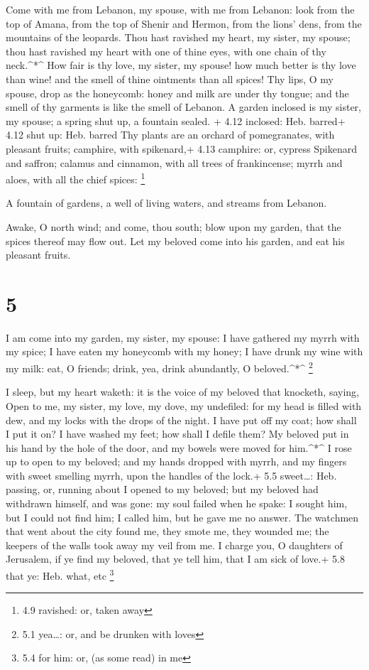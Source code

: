  Come with me from Lebanon, my spouse, with me from Lebanon:
look from the top of Amana, from the top of Shenir and Hermon, from the
lions' dens, from the mountains of the leopards.  Thou hast
ravished my heart, my sister, my spouse; thou hast ravished my heart
with one of thine eyes, with one chain of thy neck.\^{}*\^{}
 How fair is thy love, my sister, my spouse! how much
better is thy love than wine! and the smell of thine ointments than all
spices!  Thy lips, O my spouse, drop as the honeycomb:
honey and milk are under thy tongue; and the smell of thy garments is
like the smell of Lebanon.  A garden inclosed is my sister,
my spouse; a spring shut up, a fountain sealed. + 4.12 inclosed: Heb.
barred+ 4.12 shut up: Heb. barred  Thy plants are an
orchard of pomegranates, with pleasant fruits; camphire, with
spikenard,+ 4.13 camphire: or, cypress  Spikenard and
saffron; calamus and cinnamon, with all trees of frankincense; myrrh and
aloes, with all the chief spices: \footnote{4.9 ravished: or, taken away}

 A fountain of gardens, a well of living waters, and
streams from Lebanon.

 Awake, O north wind; and come, thou south; blow upon my
garden, that the spices thereof may flow out. Let my beloved come into
his garden, and eat his pleasant fruits.

\hypertarget{section-4}{%
\section{5}\label{section-4}}

 I am come into my garden, my sister, my spouse: I have
gathered my myrrh with my spice; I have eaten my honeycomb with my
honey; I have drunk my wine with my milk: eat, O friends; drink, yea,
drink abundantly, O beloved.\^{}*\^{} \footnote{5.1 yea\ldots: or, and
  be drunken with loves}

 I sleep, but my heart waketh: it is the voice of my beloved
that knocketh, saying, Open to me, my sister, my love, my dove, my
undefiled: for my head is filled with dew, and my locks with the drops
of the night.  I have put off my coat; how shall I put it
on? I have washed my feet; how shall I defile them?  My
beloved put in his hand by the hole of the door, and my bowels were
moved for him.\^{}*\^{}  I rose up to open to my beloved;
and my hands dropped with myrrh, and my fingers with sweet smelling
myrrh, upon the handles of the lock.+ 5.5 sweet\ldots: Heb. passing, or,
running about  I opened to my beloved; but my beloved had
withdrawn himself, and was gone: my soul failed when he spake: I sought
him, but I could not find him; I called him, but he gave me no answer.
 The watchmen that went about the city found me, they smote
me, they wounded me; the keepers of the walls took away my veil from me.
 I charge you, O daughters of Jerusalem, if ye find my
beloved, that ye tell him, that I am sick of love.+ 5.8 that ye: Heb.
what, etc \footnote{5.4 for him: or, (as some read) in me}

